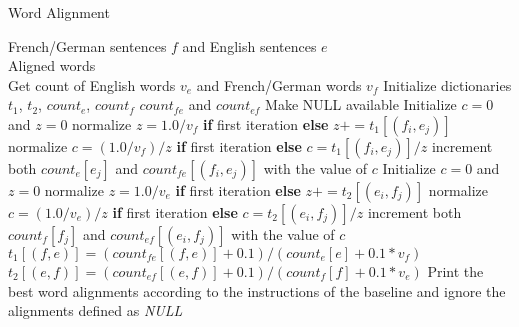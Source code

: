 \documentclass[11pt]{article}
\begin{document}
\begin{algorithm}[htb]
	\renewcommand{\algorithmicrequire}{\textbf{Input:}\hspace{10.7pt}}
	\renewcommand\algorithmicensure {\textbf{Output:} }
	\caption{Word Alignment}
	\label{alg:pbg}
		\begin{algorithmic}[1]
		\vspace{3pt}
		\REQUIRE
		French/German sentences $f$ and English sentences $e$\\
		\ENSURE Aligned words \\
		\STATE Get count of English words $v_e$ and French/German words $v_f$
		\STATE Initialize dictionaries $t_1$, $t_2$, $count_e$, $count_f$  $count_{fe}$ and $count_{ef}$
		\REPEAT
		  \STATE Make NULL available
			  \STATE Initialize $c = 0$ and $z = 0$
			    \STATE normalize $z = 1.0 / v_f$ \textbf{if} first iteration \textbf{else} $z += t_1[(f_i,e_j)]$ 
			  \ENDFOR
			    \STATE normalize $c = (1.0/v_f)/z$ \textbf{if} first iteration \textbf{else} $c = t_1[(f_i, e_j)]/z$
			    \STATE increment both $count_e[e_j]$ and $count_{fe}[(f_i,e_j)]$ with the value of $c$
			  \ENDFOR
			\ENDFOR
			  \STATE Initialize $c = 0$ and $z = 0$
			    \STATE normalize $z = 1.0 / v_e$ \textbf{if} first iteration \textbf{else} $z += t_2[(e_i,f_j)]$ 
			  \ENDFOR
			    \STATE normalize $c = (1.0/v_e)/z$ \textbf{if} first iteration \textbf{else} $c = t_2[(e_i, f_j)]/z$
			    \STATE increment both $count_f[f_j]$ and $count_{ef}[(e_i,f_j)]$ with the value of $c$
			  \ENDFOR
			\ENDFOR
		  \ENDFOR
		    \STATE $t_1[(f,e)] = (count_{fe}[(f,e)] + 0.1)/(count_e[e] + 0.1 * v_f)$
		  \ENDFOR
		    \STATE $t_2[(e,f)] = (count_{ef}[(e, f)] + 0.1)/(count_f[f] + 0.1 * v_e)$
		  \ENDFOR
		\STATE Print the best word alignments according to the instructions of the baseline and ignore the alignments defined as \textit{NULL}
	\end{algorithmic}
\end{algorithm}
\end{document}

